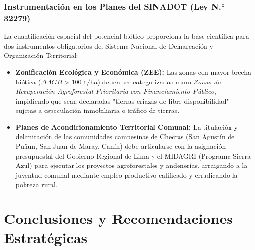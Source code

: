 \documentclass[11pt,a4paper]{article}
\begin{document}
\subsubsection{Instrumentación en los Planes del SINADOT (Ley N.° 32279)}
La cuantificación espacial del potencial biótico proporciona la base científica para dos instrumentos obligatorios del Sistema Nacional de Demarcación y Organización Territorial:
\begin{itemize}[leftmargin=*]
    \item \textbf{Zonificación Ecológica y Económica (ZEE):} Las zonas con mayor brecha biótica ($\Delta AGB > 100\text{ t/ha}$) deben ser categorizadas como \textit{Zonas de Recuperación Agroforestal Prioritaria con Financiamiento Público}, impidiendo que sean declaradas "tierras eriazas de libre disponibilidad" sujetas a especulación inmobiliaria o tráfico de tierras.
    \item \textbf{Planes de Acondicionamiento Territorial Comunal:} La titulación y delimitación de las comunidades campesinas de Checras (San Agustín de Puñun, San Juan de Maray, Canín) debe articularse con la asignación presupuestal del Gobierno Regional de Lima y el MIDAGRI (Programa Sierra Azul) para ejecutar los proyectos agroforestales y andenerías, arraigando a la juventud comunal mediante empleo productivo calificado y erradicando la pobreza rural.
\end{itemize}

\newpage

\section{Conclusiones y Recomendaciones Estratégicas}
\end{document}
